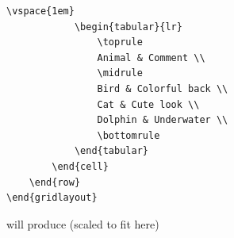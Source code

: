 \begin{example}
\begin{lstlisting}[style=custom-latex-example]
            \vspace{1em}
            \begin{tabular}{lr}
                \toprule
                Animal & Comment \\
                \midrule
                Bird & Colorful back \\
                Cat & Cute look \\
                Dolphin & Underwater \\
                \bottomrule
            \end{tabular}
        \end{cell}
    \end{row}
\end{gridlayout}
    \end{lstlisting}
    
    will produce (scaled to fit here)
    

\end{example}
